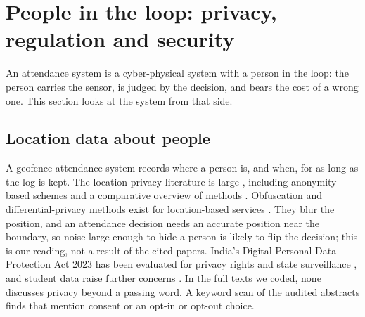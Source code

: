 \documentclass[12pt]{article}
\let\cite\citep
\begin{document}
\section{People in the loop: privacy, regulation and security}\label{sec:priv}
An attendance system is a cyber-physical system with a person in the loop: the person carries the sensor, is judged by the decision, and bears the cost of a wrong one. This section looks at the system from that side.

\subsection{Location data about people}
A geofence attendance system records where a person is, and when, for as long as the log is kept. The location-privacy literature is large \cite{liu2018location,krumm2009privacy,beresford2003location}, including anonymity-based schemes \cite{fei2019anonymity} and a comparative overview of methods \cite{chatzikokolakis2017methods}. Obfuscation and differential-privacy methods exist for location-based services \cite{wang2012l2p2,wang2023efficient}. They blur the position, and an attendance decision needs an accurate position near the boundary, so noise large enough to hide a person is likely to flip the decision; this is our reading, not a result of the cited papers. India's Digital Personal Data Protection Act 2023 \cite{dpdp2023} has been evaluated for privacy rights and state surveillance \cite{poulomibanerjeedrsrijanmishra2026evaluating}, and student data raise further concerns \cite{huang2023ethics,pea2022four}. In the \ftN{} full texts we coded, none discusses privacy beyond a passing word. A keyword scan of the \hfN{} audited abstracts finds \hfConsent{} that mention consent or an opt-in or opt-out choice.
\end{document}
